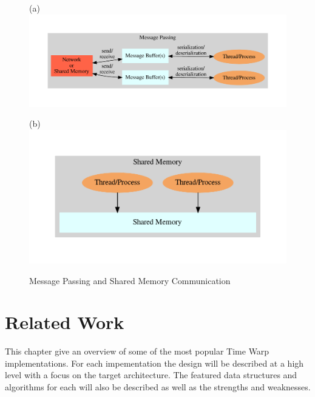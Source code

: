 \documentclass[11pt]{book}
\begin{document}
\begin{figure}
  \begin{minipage}{.5\textwidth}
    \begin{center}
      (a)
      \includegraphics[width=\textwidth,keepaspectratio,quiet]{figs/graphviz/message_passing.pdf}
    \end{center}  
  \end{minipage}%
  \hfill
  \begin{minipage}{.5\textwidth}
    \begin{center}
      (b) 
      \includegraphics[width=\textwidth,keepaspectratio,quiet]{figs/graphviz/shared_memory.pdf}
    \end{center}  
  \end{minipage}
  \caption{Message Passing and Shared Memory Communication}\label{communication}
\end{figure}



\chapter{Related Work}\label{related_work}

This chapter give an overview of some of the most popular Time Warp implementations.  For each
impementation the design will be described at a high level with a focus on the target architecture.
The featured data structures and algorithms for each will also be described as well as the strengths
and weaknesses.
\end{document}
